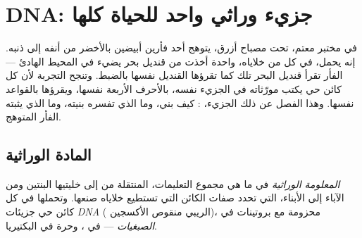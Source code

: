 \chapter{DNA: جزيء وراثي واحد للحياة كلها}\label{ch:g10:universal-dna}

في مختبر معتم، تحت مصباح أزرق، يتوهج أحد فأرين أبيضين بالأخضر من
أنفه إلى ذنبه. إنه يحمل، في كل  من خلاياه،  واحدة أخذت من
قنديل بحر يضيء في المحيط الهادئ ---  الفأر تقرأ  قنديل
البحر تلك كما تقرؤها  القنديل نفسها بالضبط. وتنجح التجربة لأن كل
كائن حي يكتب مورّثاته في الجزيء نفسه، بالأحرف الأربعة نفسها، ويقرؤها
بالقواعد نفسها. وهذا الفصل عن ذلك الجزيء، : كيف بني، وما الذي
تفسره بنيته، وما الذي يثبته الفأر المتوهج.

\section{المادة الوراثية}

\begin{definition}\label{def:g10:universal-dna:information}
\emph{المعلومة الوراثية} في  ما هي مجموع
التعليمات، المنتقلة من  إلى خليتيها البنتين ومن الآباء إلى
الأبناء، التي تحدد صفات الكائن  التي تستطيع خلاياه صنعها.
وتحملها في كل كائن حي جزيئات \emph{DNA} (
الريبي منقوص الأكسجين)، محزومة مع بروتينات في
\emph{الصبغيات} --- في  ، وحرة
في  البكتيريا.
\end{definition}

